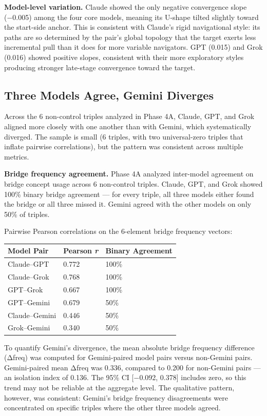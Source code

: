\textbf{Model-level variation.} Claude showed the only negative convergence slope (−0.005) among the four core models, meaning its U-shape tilted slightly toward the start-side anchor. This is consistent with Claude's rigid navigational style: its paths are so determined by the pair's global topology that the target exerts less incremental pull than it does for more variable navigators. GPT (0.015) and Grok (0.016) showed positive slopes, consistent with their more exploratory styles producing stronger late-stage convergence toward the target.

\subsection{Three Models Agree, Gemini Diverges}\label{three-models-agree-gemini-diverges}

Across the 6 non-control triples analyzed in Phase 4A, Claude, GPT, and Grok aligned more closely with one another than with Gemini, which systematically diverged. The sample is small (6 triples, with two universal-zero triples that inflate pairwise correlations), but the pattern was consistent across multiple metrics.

\textbf{Bridge frequency agreement.} Phase 4A analyzed inter-model agreement on bridge concept usage across 6 non-control triples. Claude, GPT, and Grok showed 100\% binary bridge agreement --- for every triple, all three models either found the bridge or all three missed it. Gemini agreed with the other models on only 50\% of triples.

Pairwise Pearson correlations on the 6-element bridge frequency vectors:

\begin{longtable}[]{@{}lll@{}}
\toprule\noalign{}
Model Pair & Pearson \emph{r} & Binary Agreement \\
\midrule\noalign{}
\endhead
\bottomrule\noalign{}
\endlastfoot
Claude--GPT & 0.772 & 100\% \\
Claude--Grok & 0.768 & 100\% \\
GPT--Grok & 0.667 & 100\% \\
GPT--Gemini & 0.679 & 50\% \\
Claude--Gemini & 0.446 & 50\% \\
Grok--Gemini & 0.340 & 50\% \\
\end{longtable}

To quantify Gemini's divergence, the mean absolute bridge frequency difference (\textbar Δfreq\textbar) was computed for Gemini-paired model pairs versus non-Gemini pairs. Gemini-paired mean \textbar Δfreq\textbar{} was 0.336, compared to 0.200 for non-Gemini pairs --- an isolation index of 0.136. The 95\% CI {[}−0.092, 0.378{]} includes zero, so this trend may not be reliable at the aggregate level. The qualitative pattern, however, was consistent: Gemini's bridge frequency disagreements were concentrated on specific triples where the other three models agreed.

